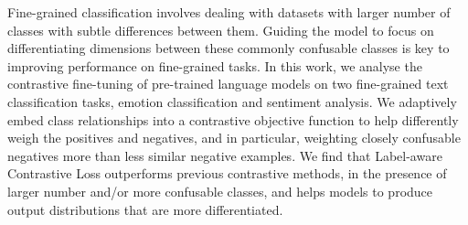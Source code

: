 Fine-grained classification involves dealing with datasets with larger number of classes with subtle differences between them. Guiding the model to focus on differentiating dimensions between these commonly confusable classes is key to improving performance on fine-grained tasks. In this work, we analyse the contrastive fine-tuning of pre-trained language models on two fine-grained text classification tasks, emotion classification and sentiment analysis. We adaptively embed class relationships into a contrastive objective function to help differently weigh the positives and negatives, and in particular, weighting closely confusable negatives more than less similar negative examples. We find that Label-aware Contrastive Loss outperforms previous contrastive methods, in the presence of larger number and/or more confusable classes, and helps models to produce output distributions that are more differentiated.
